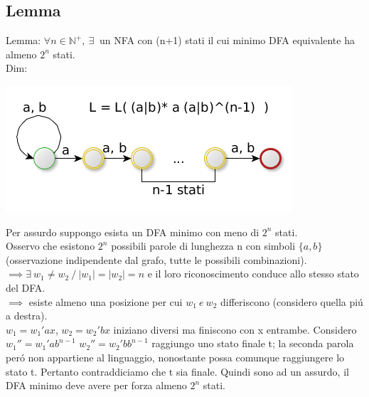 \subsection{Lemma}
Lemma: $\forall n \in \mathbb{N}^+,\ \exists\ $ un NFA con (n+1) stati il cui minimo DFA equivalente ha almeno $2^n$ stati.\\

Dim: 
\begin{center}
	\includegraphics[scale=0.5]{Chapters/Img/c02_10.png}\\
\end{center} 

Per assurdo suppongo esista un DFA minimo con meno di $2^n$ stati.\\
Osservo che esistono $2^n$ possibili parole di lunghezza n con simboli $\{ a, b\}$ (osservazione indipendente dal grafo, tutte le possibili combinazioni).\\
$\implies \exists\ w_1 \not = w_2 \ / \ |w_1| = |w_2| = n $ e il loro riconoscimento conduce allo stesso stato del DFA.\\
$\implies$ esiste almeno una posizione per cui $w_1 \ e\ w_2$ differiscono (considero quella pi\'u a destra).\\

$w_1 = w_1'ax$, $w_2 = w_2'bx$ iniziano diversi ma finiscono con x entrambe.
Considero $w_1'' = w_1'ab^{n-1}$ $w_2'' = w_2'bb^{n-1}$ raggiungo uno stato finale t; la seconda parola per\'o non appartiene al 
linguaggio, nonostante possa comunque raggiungere lo stato t. Pertanto contraddiciamo che t sia finale.
Quindi sono ad un assurdo, il DFA minimo deve avere per forza almeno $2^n$ stati.

